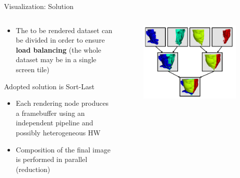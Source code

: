 \documentclass{beamer}
\begin{document}
  \begin{frame}{Visualization: Solution}
		
\begin{columns}[T] %
\begin{column}{.48\textwidth}

\begin{itemize}
			\item The to be rendered dataset can be divided in order to ensure \textbf{load balancing} (the whole dataset may be in a single screen tile)


		\end{itemize}
\begin{exampleblock}{Adopted solution is Sort-Last}
		\begin{itemize}
			
			\item Each rendering node produces a framebuffer using an independent pipeline and possibly heterogeneous HW
			\item Composition of the final image is performed in parallel (reduction)

		\end{itemize}
		
		

		\end{exampleblock}	
\end{column}%
\hfill%
\begin{column}{.58\textwidth}

\begin{figure}
			 \centering
			   \includegraphics[scale=0.2]{parrend}
		 \end{figure}

\end{column}%
\end{columns}		
		
		
	
		
\end{frame} %
\end{document}
